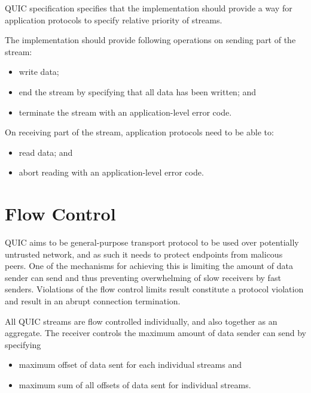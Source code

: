 QUIC specification specifies that the implementation should provide a way for application protocols
to specify relative priority of streams. 

The implementation should provide following operations on sending part of the stream:

\begin{itemize}

  \item write data;
  \item end the stream by specifying that all data has been written; and
  \item terminate the stream with an application-level error code.

\end{itemize}

On receiving part of the stream, application protocols need to be able to:

\begin{itemize}

  \item read data; and
  \item abort reading with an application-level error code.

\end{itemize}


\section{Flow Control}

QUIC aims to be general-purpose transport protocol to be used over potentially untrusted network,
and as such it needs to protect endpoints from malicous peers. One of the mechanisms for achieving
this is limiting the amount of data sender can send and thus preventing overwhelming of slow
receivers by fast senders. Violations of the flow control limits result constitute a protocol
violation and result in an abrupt connection termination.

All QUIC streams are flow controlled individually, and also together as an aggregate. The receiver
controls the maximum amount of data sender can send by specifying

\begin{itemize}
  \item maximum offset of data sent for each individual streams and
  \item maximum sum of all offsets of data sent for individual streams.
\end{itemize}

